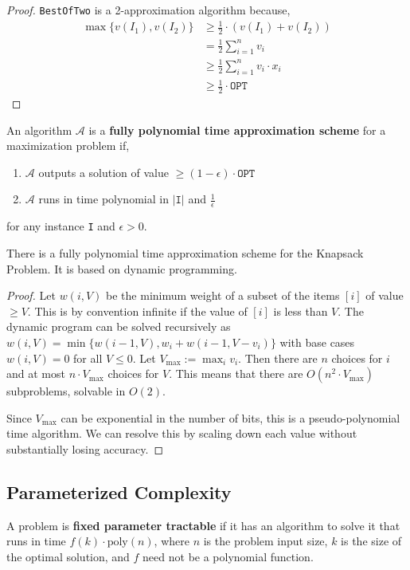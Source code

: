 \begin{proof}
	\texttt{BestOfTwo} is a 2-approximation algorithm because,
	\begin{align*}
		\max \{v(I_1), v(I_2)\} &\geq \frac{1}{2} \cdot \left(v(I_1) + v(I_2)\right) \\
								&= \frac{1}{2} \sum_{i=1}^n v_i \\
								&\geq \frac{1}{2} \sum_{i=1}^n v_i \cdot x_i \\
								&\geq \frac{1}{2} \cdot \texttt{OPT}
	\end{align*}
\end{proof}

\begin{defn}
	An algorithm $\mathcal{A}$ is a \textbf{fully polynomial time approximation scheme} for a maximization problem if, 
	\begin{enumerate}
		\item $\mathcal{A}$ outputs a solution of value $\geq (1 - \epsilon) \cdot \texttt{OPT}$
		\item $\mathcal{A}$ runs in time polynomial in $|\texttt{I}|$ and $\frac{1 }{\epsilon}$
	\end{enumerate}
	\noindent for any instance \texttt{I} and $\epsilon > 0$.
\end{defn}

\begin{thm}
	There is a fully polynomial time approximation scheme for the Knapsack Problem. It is based on dynamic programming.
\end{thm}

\begin{proof}
	Let $w(i, V)$ be the minimum weight of a subset of the items $[i]$ of value $\geq V$. This is by convention infinite if the value of $[i]$ is less than $V$. The dynamic program can be solved recursively as $w(i, V) = \min \{w(i-1,V), w_i + w(i-1, V - v_i)\}$ with base cases $w(i, V) = 0$ for all $V \leq 0$. Let $V_{\max} := \max_i v_i$. Then there are $n$ choices for $i$ and at most $n \cdot V_{\max}$ choices for $V$. This means that there are $O(n^2 \cdot V_{\max})$ subproblems, solvable in $O(2)$.

	Since $V_{\max}$ can be exponential in the number of bits, this is a pseudo-polynomial time algorithm. We can resolve this by scaling down each value without substantially losing accuracy. 
\end{proof}

\subsection{Parameterized Complexity}
\begin{defn}
	A problem is \textbf{fixed parameter tractable} if it has an algorithm to solve it that runs in time $f(k) \cdot \text{poly}(n)$, where $n$ is the problem input size, $k$ is the size of the optimal solution, and $f$ need not be a polynomial function.
\end{defn}

